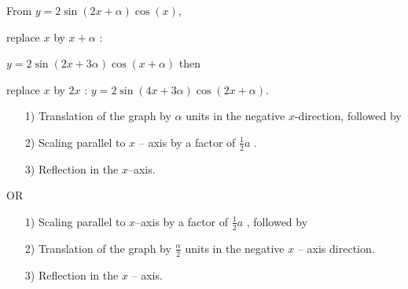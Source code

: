 \item From $y=2\sin(2x+\alpha)\cos(x)$, 

replace $x$ by $x+\alpha$ : 

$y=2\sin(2x+3\alpha)\cos(x+\alpha)$ then 

replace $x$ by $2x$ : $y=2\sin(4x+3\alpha)\cos(2x+\alpha)$.
\begin{enumerate}
\item[1)]  Translation of the graph by $\alpha$ units in the negative $x$-direction,
followed by 
\item[2)]  Scaling parallel to $x$ -- axis by a factor of $\frac{1}{2}a$
. 
\item[3)]  Reflection in the $x$--axis.
\end{enumerate}
OR 
\begin{enumerate}
\item[1)]  Scaling parallel to $x$--axis by a factor of $\frac{1}{2}a$ ,
followed by 
\item[2)]  Translation of the graph by $\frac{\alpha}{2}$ units in the negative
$x$ -- axis direction. 
\item[3)]  Reflection in the $x$ -- axis. 
\end{enumerate}